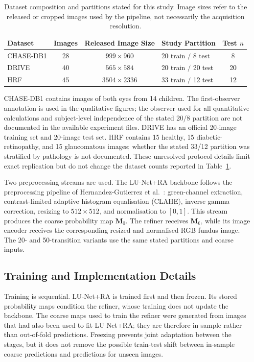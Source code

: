 \documentclass[jimaging,article,submit,pdftex,moreauthors]
  {Definitions/mdpi}
\begin{document}
\begin{table}[htbp]
\centering
\caption{Dataset composition and partitions stated for this study. Image sizes refer to the released or cropped images used by the pipeline, not necessarily the acquisition resolution.}
\label{tab:datasets}
\small
\begin{tabularx}{\textwidth}{@{}l c c X c@{}}
\toprule
Dataset & Images & Released Image Size & Study Partition & Test $n$ \\
\midrule
CHASE-DB1 & 28 & $999\times960$ & 20 train / 8 test & 8 \\
DRIVE & 40 & $565\times584$ & 20 train / 20 test & 20 \\
HRF & 45 & $3504\times2336$ & 33 train / 12 test & 12 \\
\bottomrule
\end{tabularx}
\end{table}

CHASE-DB1 contains images of both eyes from 14 children. The first-observer annotation is used in the qualitative figures; the observer used for all quantitative calculations and subject-level independence of the stated 20/8 partition are not documented in the available experiment files. DRIVE has an official 20-image training set and 20-image test set. HRF contains 15 healthy, 15 diabetic-retinopathy, and 15 glaucomatous images; whether the stated 33/12 partition was stratified by pathology is not documented. These unresolved protocol details limit exact replication but do not change the dataset counts reported in Table~\ref{tab:datasets}.

Two preprocessing streams are used. The LU-Net+RA backbone follows the preprocessing pipeline of Hernandez-Gutierrez et al.~\cite{Hernandez2025}: green-channel extraction, contrast-limited adaptive histogram equalisation (CLAHE), inverse gamma correction, resizing to $512\times512$, and normalisation to $[0,1]$. This stream produces the coarse probability map $\mathbf{M}_0$. The refiner receives $\mathbf{M}_0$, while its image encoder receives the corresponding resized and normalised RGB fundus image. The 20- and 50-transition variants use the same stated partitions and coarse inputs.

\subsection{Training and Implementation Details}

Training is sequential. LU-Net+RA is trained first and then frozen. Its stored probability maps condition the refiner, whose training does not update the backbone. The coarse maps used to train the refiner were generated from images that had also been used to fit LU-Net+RA; they are therefore in-sample rather than out-of-fold predictions. Freezing prevents joint adaptation between the stages, but it does not remove the possible train-test shift between in-sample coarse predictions and predictions for unseen images.
\end{document}
